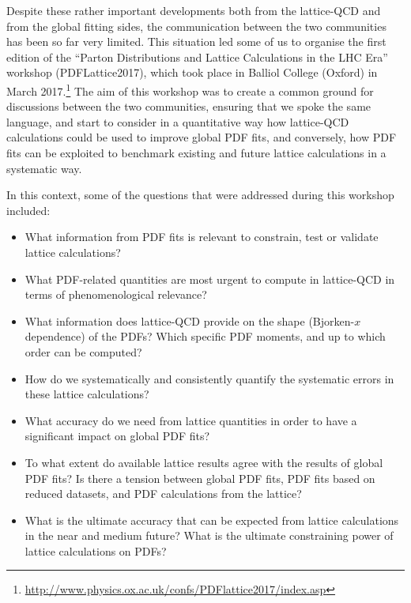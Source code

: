 Despite these rather important developments both from the lattice-QCD
and from the global fitting sides,
the communication between the
two communities has been so far very limited.
%
This situation led some of us
to organise the first edition of the
``Parton Distributions and Lattice Calculations in the LHC Era''
workshop (PDFLattice2017), which took
place in Balliol College (Oxford) in March
2017.\footnote{\url{http://www.physics.ox.ac.uk/confs/PDFlattice2017/index.asp}}
%
The aim of this workshop was to create a common ground for discussions
between the two communities, ensuring that we spoke the same language,
and start to consider in a quantitative way how lattice-QCD calculations could be used
to improve global PDF fits, and conversely, how PDF fits can be exploited to benchmark
existing and future lattice calculations in a systematic way.

In this context, some of the questions that were addressed during this workshop
included:
\begin{itemize}
\item What information from PDF fits is relevant to constrain, test or validate lattice calculations?

\item What PDF-related quantities are most urgent
  to compute in lattice-QCD in terms of phenomenological relevance?

\item What information does lattice-QCD provide on the
  shape (Bjorken-$x$ dependence) of the PDFs? Which specific
  PDF moments,
  and up to which order can be computed?
  
\item How do we systematically and consistently quantify the systematic errors in these lattice calculations?

\item What accuracy do we need from lattice quantities 
  in order to have a significant impact on global PDF fits?

\item To what extent do available lattice results agree with the results of
  global PDF fits? Is there a tension between global PDF fits, PDF
  fits based on reduced datasets, and PDF calculations from the lattice?

  \item What is the ultimate accuracy that can be expected from lattice
calculations in the near and medium future? What is the ultimate
constraining power of lattice calculations on PDFs?

\end{itemize}

